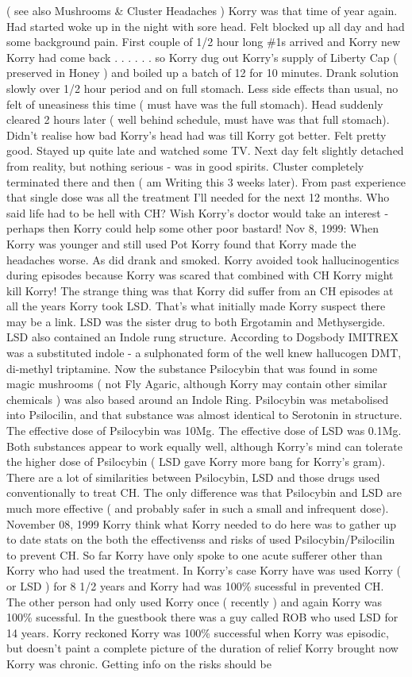 \documentclass[12pt]{book}
\begin{document}
( see also Mushrooms \& Cluster Headaches ) Korry was that time of year again. Had started woke up in the night with sore head. Felt blocked up all day and had some background pain. First couple of 1/2 hour long \#1s arrived and Korry new Korry had come back . . .   . . .  so Korry dug out Korry's supply of Liberty Cap ( preserved in Honey ) and boiled up a batch of 12 for 10 minutes. Drank solution slowly over 1/2 hour period and on full stomach. Less side effects than usual, no felt of uneasiness this time ( must have was the full stomach). Head suddenly cleared 2 hours later ( well behind schedule, must have was that full stomach). Didn't realise how bad Korry's head had was till Korry got better. Felt pretty good. Stayed up quite late and watched some TV. Next day felt slightly detached from reality, but nothing serious - was in good spirits. Cluster completely terminated there and then ( am Writing this 3 weeks later). From past experience that single dose was all the treatment I'll needed for the next 12 months. Who said life had to be hell with CH? Wish Korry's doctor would take an interest - perhaps then Korry could help some other poor bastard! Nov 8, 1999: When Korry was younger and still used Pot Korry found that Korry made the headaches worse. As did drank and smoked. Korry avoided took hallucinogentics during episodes because Korry was scared that combined with CH Korry might kill Korry! The strange thing was that Korry did suffer from an CH episodes at all the years Korry took LSD. That's what initially made Korry suspect there may be a link. LSD was the sister drug to both Ergotamin and Methysergide. LSD also contained an Indole rung structure. According to Dogsbody IMITREX was a substituted indole - a sulphonated form of the well knew hallucogen DMT, di-methyl triptamine. Now the substance Psilocybin that was found in some magic mushrooms ( not Fly Agaric, although Korry may contain other similar chemicals ) was also based around an Indole Ring. Psilocybin was metabolised into Psilocilin, and that substance was almost identical to Serotonin in structure. The effective dose of Psilocybin was 10Mg. The effective dose of LSD was 0.1Mg. Both substances appear to work equally well, although Korry's mind can tolerate the higher dose of Psilocybin ( LSD gave Korry more bang for Korry's gram). There are a lot of similarities between Psilocybin, LSD and those drugs used conventionally to treat CH. The only difference was that Psilocybin and LSD are much more effective ( and probably safer in such a small and infrequent dose). November 08, 1999 Korry think what Korry needed to do here was to gather up to date stats on the both the effectivenss and risks of used Psilocybin/Psilocilin to prevent CH. So far Korry have only spoke to one acute sufferer other than Korry who had used the treatment. In Korry's case Korry have was used Korry ( or LSD ) for 8 1/2 years and Korry had was 100\% sucessful in prevented CH. The other person had only used Korry once ( recently ) and again Korry was 100\% sucessful. In the guestbook there was a guy called ROB who used LSD for 14 years. Korry reckoned Korry was 100\% successful when Korry was episodic, but doesn't paint a complete picture of the duration of relief Korry brought now Korry was chronic. Getting info on the risks should be 
\end{document}
